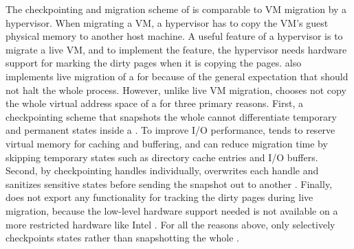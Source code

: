 The checkpointing and migration scheme of \thelibos{} is comparable to
VM migration by a hypervisor.
When migrating a VM, a hypervisor has to copy the VM's guest physical memory to another host machine.
A useful feature of a hypervisor is to migrate a live VM,
and to implement the feature, the hypervisor needs hardware support for marking the dirty pages when it is copying the pages.
\graphene{} also implements live migration of a \picoproc{} for 
because of the general expectation
that  should not halt the whole process.
However, unlike live VM migration, \graphene{} chooses not %
copy the whole virtual address space
of a \picoproc{}
for three primary reasons.
First, a checkpointing scheme that snapshots the whole \picoproc{}
cannot differentiate temporary and permanent states inside a \libos{}.
To improve I/O performance, \thelibos{} tends to reserve %
virtual memory for caching and buffering, and \thelibos{} can reduce migration time by skipping temporary states such as directory cache entries and I/O buffers.
Second, by checkpointing handles individually,
\thelibos{} overwrites each handle and sanitizes sensitive states before sending the snapshot out to another \picoproc{}.
Finally, \thehostabi{} does not export any functionality for tracking
the dirty pages during live migration,
because the low-level hardware support needed
is not available on a more restricted hardware like Intel \sgx{}.
For all the reasons above,
\thelibos{} only selectively checkpoints \libos{} states rather than snapshotting the whole \picoproc{}.








